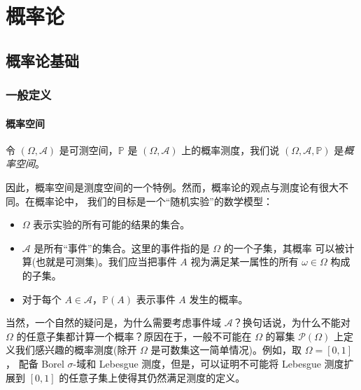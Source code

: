 \documentclass[fontset=none]{Notes}
\begin{document}
\part{概率论}

\chapter{概率论基础}

\section{一般定义}

\subsection{概率空间}

令 $(\Omega,\mathcal{A})$ 是可测空间，$\mathbb{P}$ 是 $(\Omega,\mathcal{A})$
上的概率测度，我们说 $(\Omega,\mathcal{A},\mathbb{P})$ 是\emph{概率空间}。

因此，概率空间是测度空间的一个特例。然而，概率论的观点与测度论有很大不同。在概率论中，
我们的目标是一个“随机实验”的数学模型：
\begin{itemize}[nosep]
  \item $\Omega$ 表示实验的所有可能的结果的集合。
  \item $\mathcal{A}$ 是所有“事件”的集合。这里的事件指的是 $\Omega$ 的一个子集，其概率
  可以被计算(也就是可测集)。我们应当把事件 $A$ 视为满足某一属性的所有 $\omega\in\Omega$ 
  构成的子集。
  \item 对于每个 $A\in \mathcal{A}$，$\mathbb{P}(A)$ 表示事件 $A$ 发生的概率。
\end{itemize}

当然，一个自然的疑问是，为什么需要考虑事件域 $\mathcal{A}$？换句话说，为什么不能对
$\Omega$ 的任意子集都计算一个概率？原因在于，一般不可能在 $\Omega$ 的幂集 $\mathcal{P}(\Omega)$
上定义我们感兴趣的概率测度(除开 $\Omega$ 是可数集这一简单情况)。例如，取 $\Omega=[0,1]$，
配备 Borel $\sigma$-域和 Lebesgue 测度，但是，可以证明不可能将 Lebesgue 测度扩展到
$[0,1]$ 的任意子集上使得其仍然满足测度的定义。
\end{document}
